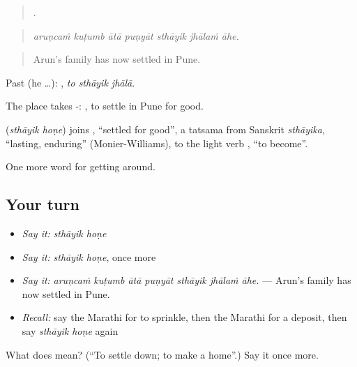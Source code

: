 \begin{quote}
      .
\end{quote}

\begin{quote}
\emph{aruṇcaṁ kuṭumb ātā puṇyāt sthāyik jhālaṁ āhe.}
\end{quote}

\begin{quote}
Arun's family has now settled in Pune.
\end{quote}

Past (he …):   , \emph{to sthāyik jhālā}.

The place takes -:   , to settle in Pune for good.

\begin{cousinweb}
\textbf{ } (\emph{sthāyik hoṇe}) joins \textbf{}, \textquotedblleft{}settled for good\textquotedblright{}, a tatsama from Sanskrit \emph{sthāyika}, \textquotedblleft{}lasting, enduring\textquotedblright{} (Monier-Williams), to the light verb \textbf{}, \textquotedblleft{}to become\textquotedblright{}.
\end{cousinweb}

\begin{grammarlens}[title={What you've built}]
One more word for getting around.
\end{grammarlens}

\subsection*{Your turn}
\begin{itemize}
\raggedright
  \item \emph{Say it:} \emph{sthāyik hoṇe}
  \item \emph{Say it:} \emph{sthāyik hoṇe}, once more
  \item \emph{Say it:} \emph{aruṇcaṁ kuṭumb ātā puṇyāt sthāyik jhālaṁ āhe.} — Arun's family has now settled in Pune.
  \item \emph{Recall:} say the Marathi for to sprinkle, then the Marathi for a deposit, then say \emph{sthāyik hoṇe} again
\end{itemize}

\begin{tcolorbox}[breakable,colback=teal!4,colframe=teal!35!black,title={Before you move on}]
What does   mean? (\textquotedblleft{}To settle down; to make a home\textquotedblright{}.) Say it once more.
\end{tcolorbox}
